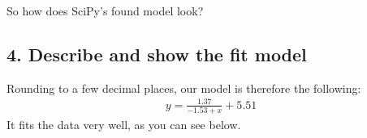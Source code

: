 \documentclass[letterpaper,10pt,english]{sphinxmanual}
\begin{document}
So how does SciPy’s found model look?


\subsection{4. Describe and show the fit model}
\label{\detokenize{chapter-9-math-and-stats:describe-and-show-the-fit-model}}
Rounding to a few decimal places, our model is therefore the following:
\begin{equation*}
\begin{split} y=\frac{1.37}{-1.53+x}+5.51 \end{split}
\end{equation*}
It fits the data very well, as you can see below.

\begin{sphinxVerbatim}[commandchars=\\\{\}]
         
   
     
\end{sphinxVerbatim}

\noindent{}
\end{document}
